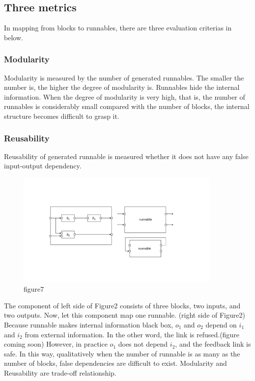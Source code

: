 \documentclass[conference,compsoc]{IEEEtran}
\begin{document}
\subsection{Three metrics}
 In mapping from blocks to runnables, there are three evaluation criterias in below.
\subsubsection{Modularity}
 Modularity is measured by the number of generated runnables.
The smaller the number is, the higher the degree of modularity is.
Runnables hide the internal information.
When the degree of modularity is very high, that is, the number of runnables is considerably small compared with the number of blocks,
the internal structure becomes difficult to grasp it.
\subsubsection{Reusability}
 Reusability of generated runnable is measured whether it does not have any false input-output dependency.
\begin{figure}
	\centering
	\includegraphics[width=10cm,clip]{figure6.pdf}
	\caption{figure7}
	\label{fig7}
\end{figure}
 The component of left side of Figure2 consists of three blocks, two inputs, and two outputs.
Now, let this component map one runnable. (right side of Figure2)
Because runnable makes internal information black box, $o_1$ and $o_2$ depend on $i_1$ and $i_2$ from external information.
In the other word, the link is refused.(figure coming soon)
However, in practice $o_1$ does not depend $i_2$, and the feedback link is safe. 
In this way, qualitatively when the number of runnable is as many as the number of blocks, false dependencies are difficult to exist.
Modularity and Reusability are trade-off relationship.
\end{document}
